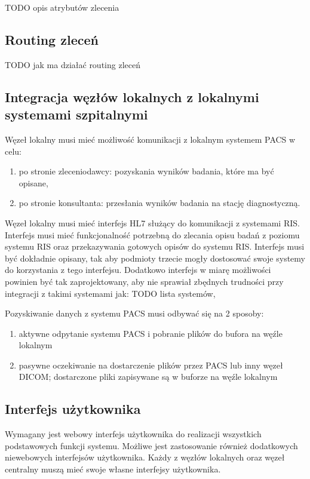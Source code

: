 \documentclass[a4paper]{article}
\begin{document}
TODO opis atrybutów zlecenia

\subsection{Routing zleceń}

TODO jak ma działać routing zleceń

\subsection{Integracja węzłów lokalnych z lokalnymi systemami szpitalnymi}

Węzeł lokalny musi mieć możliwość komunikacji z lokalnym systemem PACS w celu:
\begin{enumerate}
 \item po stronie zleceniodawcy: pozyskania wyników badania, które ma być opisane,
 \item po stronie konsultanta: przesłania wyników badania na stację diagnostyczną.
\end{enumerate}

Węzeł lokalny musi mieć interfejs HL7 służący do komunikacji z systemami RIS. Interfejs musi mieć funkcjonalność potrzebną do zlecania opisu badań z poziomu systemu RIS oraz przekazywania gotowych opisów do systemu RIS. Interfejs musi być dokładnie opisany, tak aby podmioty trzecie mogły dostosować swoje systemy do korzystania z tego interfejsu. Dodatkowo interfejs w miarę możliwości powinien być tak zaprojektowany, aby nie sprawiał zbędnych trudności przy integracji z takimi systemami jak: TODO lista systemów, 

Pozyskiwanie danych z systemu PACS musi odbywać się na 2 sposoby:
\begin{enumerate}
  \item aktywne odpytanie systemu PACS i pobranie plików do bufora na węźle lokalnym
  \item pasywne oczekiwanie na dostarczenie plików przez PACS lub inny węzeł DICOM; dostarczone pliki zapisywane są w buforze na węźle lokalnym
\end{enumerate}

\subsection{Interfejs użytkownika}

Wymagany jest webowy interfejs użytkownika do realizacji wszystkich podstawowych funkcji systemu. Możliwe jest zastosowanie również dodatkowych niewebowych interfejsów użytkownika. Każdy z węzłów lokalnych oraz węzeł centralny muszą mieć swoje własne interfejsy użytkownika.
\end{document}
